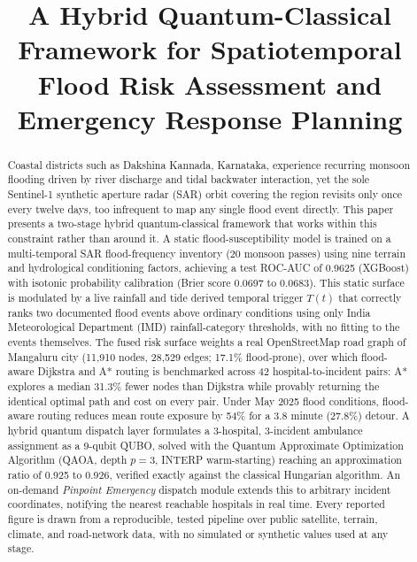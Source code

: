 \documentclass[conference]{IEEEtran}
\begin{document}
\title{A Hybrid Quantum-Classical Framework for Spatiotemporal Flood Risk Assessment and Emergency Response Planning}

\author{}

\maketitle

\begin{abstract}
Coastal districts such as Dakshina Kannada, Karnataka, experience recurring monsoon flooding driven by river discharge and tidal backwater interaction, yet the sole Sentinel-1 synthetic aperture radar (SAR) orbit covering the region revisits only once every twelve days, too infrequent to map any single flood event directly. This paper presents a two-stage hybrid quantum-classical framework that works within this constraint rather than around it. A static flood-susceptibility model is trained on a multi-temporal SAR flood-frequency inventory (20 monsoon passes) using nine terrain and hydrological conditioning factors, achieving a test ROC-AUC of 0.9625 (XGBoost) with isotonic probability calibration (Brier score 0.0697 to 0.0683). This static surface is modulated by a live rainfall and tide derived temporal trigger $T(t)$ that correctly ranks two documented flood events above ordinary conditions using only India Meteorological Department (IMD) rainfall-category thresholds, with no fitting to the events themselves. The fused risk surface weights a real OpenStreetMap road graph of Mangaluru city (11{,}910 nodes, 28{,}529 edges; 17.1\% flood-prone), over which flood-aware Dijkstra and A* routing is benchmarked across 42 hospital-to-incident pairs: A* explores a median 31.3\% fewer nodes than Dijkstra while provably returning the identical optimal path and cost on every pair. Under May 2025 flood conditions, flood-aware routing reduces mean route exposure by 54\% for a 3.8 minute (27.8\%) detour. A hybrid quantum dispatch layer formulates a 3-hospital, 3-incident ambulance assignment as a 9-qubit QUBO, solved with the Quantum Approximate Optimization Algorithm (QAOA, depth $p=3$, INTERP warm-starting) reaching an approximation ratio of 0.925 to 0.926, verified exactly against the classical Hungarian algorithm. An on-demand \emph{Pinpoint Emergency} dispatch module extends this to arbitrary incident coordinates, notifying the nearest reachable hospitals in real time. Every reported figure is drawn from a reproducible, tested pipeline over public satellite, terrain, climate, and road-network data, with no simulated or synthetic values used at any stage.
\end{abstract}
\end{document}

